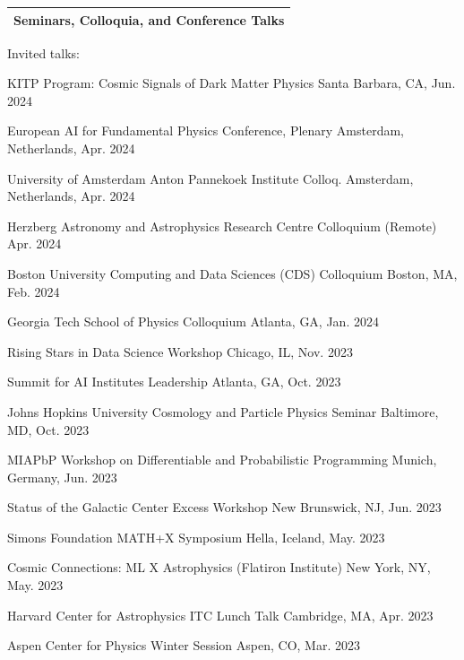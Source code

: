 \documentclass[letterpaper,11pt]{article}
\newenvironment{packed_itemize}{
\begin{itemize}[label=\raisebox{0.25ex}{\tiny$\bullet$}]
  \setlength{\itemsep}{4.2pt}
  \setlength{\parskip}{0pt}
  \setlength{\parsep}{0pt}}{\end{itemize}
}
\begin{document}


\noindent
\begin{tabular*}{\textwidth}{l@{\extracolsep{\fill}}}
\large {\sc \Large{Seminars, Colloquia, and Conference Talks}}\\
\hline
\end{tabular*}\vspace{3.5mm}

\noindent
Invited talks:
\begin{packed_itemize}
  \item KITP Program: Cosmic Signals of Dark Matter Physics \hfill Santa Barbara, CA, Jun. 2024
  \item European AI for Fundamental Physics Conference, Plenary \hfill Amsterdam, Netherlands, Apr. 2024
  \item University of Amsterdam Anton Pannekoek Institute Colloq. \hfill Amsterdam, Netherlands, Apr. 2024
  \item Herzberg Astronomy and Astrophysics Research Centre Colloquium (Remote) \hfill Apr. 2024
  \item Boston University Computing and Data Sciences (CDS) Colloquium \hfill Boston, MA, Feb. 2024
  \item Georgia Tech School of Physics Colloquium \hfill Atlanta, GA, Jan. 2024
  \item Rising Stars in Data Science Workshop \hfill Chicago, IL, Nov. 2023
  \item Summit for AI Institutes Leadership \hfill Atlanta, GA, Oct. 2023
  \item Johns Hopkins University Cosmology and Particle Physics Seminar \hfill Baltimore, MD, Oct. 2023
  \item MIAPbP Workshop on Differentiable and Probabilistic Programming \hfill Munich, Germany, Jun. 2023
  \item Status of the Galactic Center Excess Workshop \hfill New Brunswick, NJ, Jun. 2023
  \item Simons Foundation MATH+X Symposium \hfill Hella, Iceland, May. 2023
  \item Cosmic Connections: ML X Astrophysics (Flatiron Institute) \hfill New York, NY, May. 2023
  \item Harvard Center for Astrophysics ITC Lunch Talk  \hfill Cambridge, MA, Apr. 2023
  \item Aspen Center for Physics Winter Session \hfill Aspen, CO, Mar. 2023

\end{packed_itemize}
\end{document}
